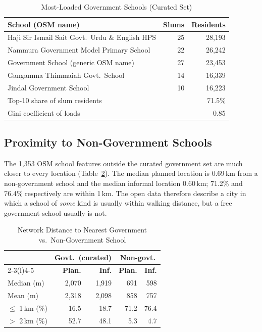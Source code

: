 \documentclass[conference]{IEEEtran}
\newcommand{\km}{\,km}
\begin{document}
\begin{table}[!t]
\centering
\caption{Most-Loaded Government Schools (Curated Set)}
\label{tab:load}
\footnotesize
\begin{tabularx}{\columnwidth}{@{}Xrr@{}}
\toprule
\textbf{School (OSM name)} & \textbf{Slums} & \textbf{Residents} \\
\midrule
Haji Sir Ismail Sait Govt.\ Urdu \& English HPS & 25 & 28,193 \\
Nammura Government Model Primary School & 22 & 26,242 \\
Government School (generic OSM name) & 27 & 23,453 \\
Gangamma Thimmaiah Govt.\ School & 14 & 16,339 \\
Jindal Government School & 10 & 16,223 \\
\midrule
Top-10 share of slum residents & \multicolumn{2}{r}{71.5\%} \\
Gini coefficient of loads & \multicolumn{2}{r}{0.85} \\
\bottomrule
\end{tabularx}
\end{table}

\subsection{Proximity to Non-Government Schools}
The 1,353 OSM school features outside the curated government set are much closer to every location (Table~\ref{tab:private}). The median planned location is 0.69\km{} from a non-government school and the median informal location 0.60\km{}; 71.2\% and 76.4\% respectively are within 1\km{}. The open data therefore describe a city in which a school of \emph{some} kind is usually within walking distance, but a free government school usually is not.

\begin{table}[!t]
\centering
\caption{Network Distance to Nearest Government vs.\ Non-Government School}
\label{tab:private}
\footnotesize
\begin{tabular}{@{}lrrrr@{}}
\toprule
& \multicolumn{2}{c}{\textbf{Govt.\ (curated)}} & \multicolumn{2}{c}{\textbf{Non-govt.}} \\
\cmidrule(lr){2-3}\cmidrule(l){4-5}
& \textbf{Plan.} & \textbf{Inf.} & \textbf{Plan.} & \textbf{Inf.} \\
\midrule
Median (m) & 2,070 & 1,919 & 691 & 598 \\
Mean (m) & 2,318 & 2,098 & 858 & 757 \\
$\le$ 1\km{} (\%) & 16.5 & 18.7 & 71.2 & 76.4 \\
$>$ 2\km{} (\%) & 52.7 & 48.1 & 5.3 & 4.7 \\
\bottomrule
\end{tabular}
\end{table}
\end{document}
